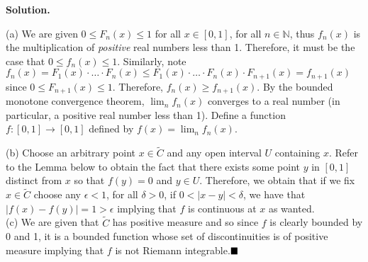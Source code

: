 \documentclass{article}
\begin{document}
    \textbf{Solution.}

    (a) We are given $0\leq F_n(x)\leq 1$ for all $x\in[0,1]$, for all $n\in\mathbb{N}$, thus $f_n(x)$ is the multiplication of
    \textit{positive} real numbers less than 1. Therefore, it must be the case that $0\leq f_n(x)\leq 1$. Similarly,
    note $f_n(x) = F_1(x)\cdot\hdots\cdot F_n(x) \leq F_1(x)\cdot\hdots\cdot F_n(x)\cdot F_{n+1}(x) = f_{n+1}(x)$
    since $0\leq F_{n+1}(x)\leq 1$. Therefore, $f_n(x)\geq f_{n+1}(x)$. By the bounded monotone convergence theorem,
    $\lim_n f_n(x)$ converges to a real number (in particular, a positive real number less than 1). 
    Define a function $f:[0,1]\to[0,1]$ defined by $f(x) = \lim_n f_n(x)$. \\

    \newpage

    (b) Choose an arbitrary point $x\in\widetilde{C}$ and any open interval $U$ containing $x$. Refer to the Lemma below to obtain
    the fact that there exists some point $y$ in $[0,1]$ distinct from $x$ so that $f(y)=0$ and $y\in U$. Therefore, we obtain that
    if we fix $x\in\widetilde{C}$ choose any $\epsilon < 1$, for all $\delta >0$, if $0<|x-y|<\delta$, we have that
    $|f(x)-f(y)| = 1 > \epsilon$ implying that $f$ is continuous at $x$ as wanted.\\

    (c) We are given that $\widetilde{C}$ has positive measure and so since $f$ is clearly bounded by 0 and 1, it is a bounded function
    whose set of discontinuities is of positive measure implying that $f$ is not Riemann integrable.$\hfill\blacksquare$
\end{document}
